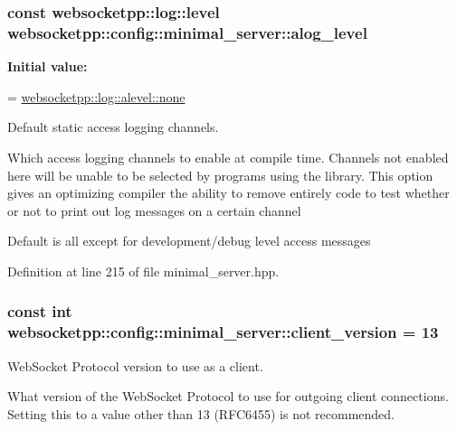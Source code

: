 \subsubsection[{alog\+\_\+level}]{\setlength{\rightskip}{0pt plus 5cm}const {\bf websocketpp\+::log\+::level} websocketpp\+::config\+::minimal\+\_\+server\+::alog\+\_\+level\hspace{0.3cm}{\ttfamily [static]}}\label{structwebsocketpp_1_1config_1_1minimal__server_ae71d1728a8d49acd97ec29a6fdfd440c}
{\bfseries Initial value\+:}
\begin{DoxyCode}
=
        \hyperlink{structwebsocketpp_1_1log_1_1alevel_a4cf0520816094999975fe73081cf30f2}{websocketpp::log::alevel::none}
\end{DoxyCode}


Default static access logging channels. 

Which access logging channels to enable at compile time. Channels not enabled here will be unable to be selected by programs using the library. This option gives an optimizing compiler the ability to remove entirely code to test whether or not to print out log messages on a certain channel

Default is all except for development/debug level access messages 

Definition at line 215 of file minimal\+\_\+server.\+hpp.

\hypertarget{structwebsocketpp_1_1config_1_1minimal__server_a186c68735f459a3242d68821c82551bc}{}
\subsubsection[{client\+\_\+version}]{\setlength{\rightskip}{0pt plus 5cm}const int websocketpp\+::config\+::minimal\+\_\+server\+::client\+\_\+version = 13\hspace{0.3cm}{\ttfamily [static]}}\label{structwebsocketpp_1_1config_1_1minimal__server_a186c68735f459a3242d68821c82551bc}


Web\+Socket Protocol version to use as a client. 

What version of the Web\+Socket Protocol to use for outgoing client connections. Setting this to a value other than 13 (R\+F\+C6455) is not recommended. 

